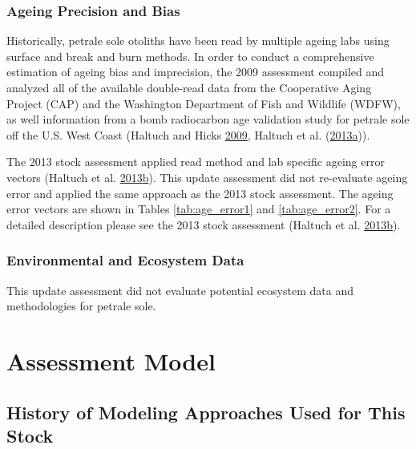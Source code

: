 \documentclass[12pt,]{article}
\begin{document}
\subsubsection{Ageing Precision and
Bias}\label{ageing-precision-and-bias}

Historically, petrale sole otoliths have been read by multiple ageing
labs using surface and break and burn methods. In order to conduct a
comprehensive estimation of ageing bias and imprecision, the 2009
assessment compiled and analyzed all of the available double-read data
from the Cooperative Aging Project (CAP) and the Washington Department
of Fish and Wildlife (WDFW), as well information from a bomb radiocarbon
age validation study for petrale sole off the U.S. West Coast (Haltuch
and Hicks \protect\hyperlink{ref-haltuch_status_2009}{2009}, Haltuch et
al.
(\protect\hyperlink{ref-haltuch_california_2013}{2013}\protect\hyperlink{ref-haltuch_california_2013}{a})).

The 2013 stock assessment applied read method and lab specific ageing
error vectors (Haltuch et al.
\protect\hyperlink{ref-haltuch_status_2013}{2013}\protect\hyperlink{ref-haltuch_status_2013}{b}).
This update assessment did not re-evaluate ageing error and applied the
same approach as the 2013 stock assessment. The ageing error vectors are
shown in Tables \ref{tab:age_error1} and \ref{tab:age_error2}. For a
detailed description please see the 2013 stock assessment (Haltuch et
al.
\protect\hyperlink{ref-haltuch_status_2013}{2013}\protect\hyperlink{ref-haltuch_status_2013}{b}).

\subsubsection{Environmental and Ecosystem
Data}\label{environmental-and-ecosystem-data}

This update assessment did not evaluate potential ecosystem data and
methodologies for petrale sole.

\section{Assessment Model}\label{assessment-model}

\subsection{History of Modeling Approaches Used for This
Stock}\label{history-of-modeling-approaches-used-for-this-stock}
\end{document}
